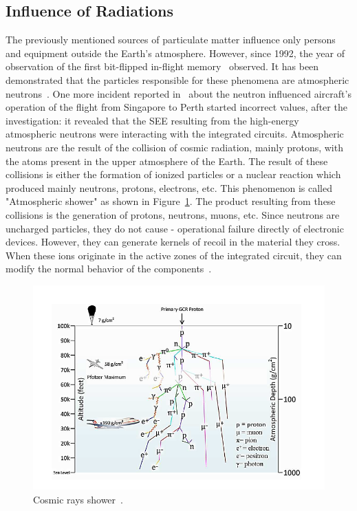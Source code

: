 \subsection{Influence of Radiations}
The previously mentioned sources of particulate matter influence only persons and equipment
outside the Earth's atmosphere. However, since 1992, the year of observation of the first
bit-flipped in-flight memory~\citep{taber1995investigation, taber1993single} observed. It has been demonstrated that the particles responsible for these
phenomena are atmospheric neutrons~\citep{leray2004atmospheric, jedec2006measurement}.
One more incident reported in~\cite{SWE2016} about the neutron influenced aircraft's operation of the flight from Singapore to Perth started incorrect values, after the investigation: it revealed that the SEE resulting from the high-energy atmospheric neutrons were interacting with the integrated circuits.
Atmospheric neutrons are the result of the collision of cosmic radiation,
mainly protons, with the atoms present in the upper atmosphere of the Earth. The result of these collisions is either the formation of ionized particles or a nuclear reaction which
produced mainly neutrons, protons, electrons, etc. This phenomenon is called
"Atmospheric shower" as shown in Figure~\ref{shower}. The product resulting from these collisions is the generation of
protons, neutrons, muons, etc. Since neutrons are uncharged particles, they do not
cause  - operational failure directly of electronic devices. However, they can generate kernels of recoil in
the material they cross. When these ions originate in the active zones of the integrated circuit, they can modify the normal behavior of the components~\cite{normand1998extensions}.
%
\begin{figure}[h]
 \centering
  \captionsetup{justification=centering}    
   \includegraphics[scale=0.75]{Figures/showerplusaircraft.png}
  \caption{Cosmic rays shower~\cite{ziegler1996ibm}.}
\label{shower}
\end{figure}
